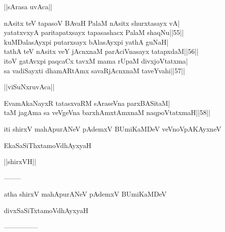 \documentclass{article}
\begin{document}
\begin{center}
||sArasa uvAca||
\end{center}

nAsitx teV tapasoV BAvaH PalaM nAsitx shurxtasayx vA|\\
yatatxvxyA paritapatxsayx tapasashacx PalaM shaqNu||55||\\
kuMDalasAyxpi putarxsayx bAlasAyxpi yathA guNaH|\\
tathA teV nAsitx veY jAcnxnaM parAciVnasayx tatapxdaM||56||\\
itoV gatAvxpi paqcaCx tavxM mama rUpaM divxjoVtatxma|\\
sa vadiSayxti dhamARtAmx savaRjAcnxnaM taveYvahi||57||\\

\begin{center}
||viSuNxruvAca||
\end{center}

EvamAkaNayxR tatasxvaRM sAraseVna parxBASitaM|\\
taM jagAma sa veVgeVna barxhAmxtAmxnaM naqpoVtatxmaH||58||

\begin{center}
iti shirxV mahApurANeV pAdemxV BUmiKaMDeV veVnoVpAKAyxneV
\end{center}

\begin{center}
EkaSaSiThxtamoVdhAyxyaH
\end{center}

\begin{center}
||shirxVH||
\end{center}

\begin{center}
--------
\end{center}

\begin{center}
atha shirxV mahApurANeV pAdemxV BUmiKaMDeV
\end{center}

\begin{center}
divxSaSiTxtamoVdhAyxyaH
\end{center}

\begin{center}

---------------
\end{center}
\end{document}
